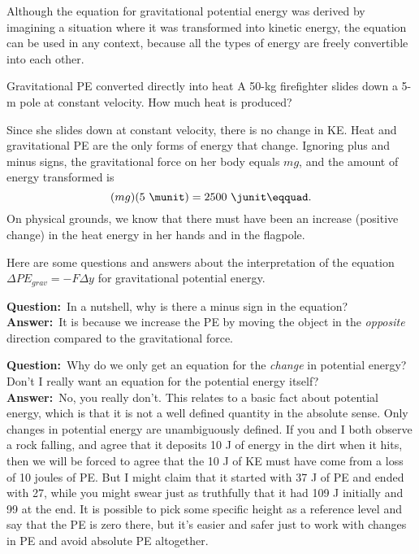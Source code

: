 Although the equation for gravitational potential energy was
derived by imagining a situation where it was transformed
into kinetic energy, the equation can be used in any
context, because all the types of energy are freely
convertible into each other.

\pagebreak

\begin{eg}{Gravitational PE converted directly into heat}
\egquestion A 50-kg firefighter slides down a 5-m pole at
constant velocity. How much heat is produced?

\eganswer Since she slides down at constant velocity, there
is no change in KE. Heat and gravitational PE are the only
forms of energy that change. Ignoring plus and minus signs,
the gravitational force on her body equals $mg$, and
the amount of energy transformed is
\begin{equation*}
                (mg)(5\ \munit)  =  2500\ \junit\eqquad.
\end{equation*}
On physical grounds, we know that there must have been an
increase (positive change) in the heat energy in her hands
and in the flagpole.
\end{eg}

Here are some questions and answers about the interpretation
of the equation $\Delta PE_{grav} =-F\Delta y$ for
gravitational potential energy.

\newcommand{\qandaquestion}{\noindent\textbf{Question:}\ }
\newcommand{\qandaanswer}{\\{}\noindent\textbf{Answer:}\ }

\qandaquestion In a nutshell, why is there a minus sign in the equation?
\qandaanswer It is because we increase the PE by moving the
object in the \emph{opposite} direction compared to the
gravitational force.

\qandaquestion Why do we only get an equation for the \emph{change}
in potential energy? Don't I really want an equation for the
potential energy itself?
\qandaanswer No, you really don't. This relates to a basic fact
about potential energy, which is that it is not a well
defined quantity in the absolute sense. Only changes in
potential energy are unambiguously defined. If you and I
both observe a rock falling, and agree that it deposits 10
J of energy in the dirt when it hits, then we will be
forced to agree that the 10 J of KE must have come from a
loss of 10 joules of PE. But I might claim that it started
with 37 J of PE and ended with 27, while you might swear
just as truthfully that it had 109 J initially and 99 at
the end. It is possible to pick some specific height as a
reference level and say that the PE is zero there, but it's
easier and safer just to work with changes in PE and avoid
absolute PE altogether.

